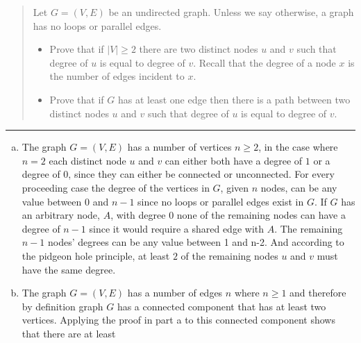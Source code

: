 \documentclass[11pt]{article}
\begin{document}


\begin{quote}
\item 
Let $G=(V,E)$ be an undirected graph. Unless we say otherwise, a graph has no loops or parallel edges.

\begin{itemize}
\item Prove that if $|V| \ge 2$ there are two distinct nodes $u$ and $v$ such that degree of $u$ is equal to degree of $v$.  Recall that the degree of a node $x$ is the number of edges incident to $x$.
\item Prove that if $G$ has at least one edge then there is a path between two distinct nodes $u$ and $v$ such that degree of $u$ is equal to degree of $v$.
\end{itemize}

\end{quote}
\hrule



\begin{solution}
\item 
\begin{enumerate}[(a)]
\item The graph $G = (V,E)$ has a number of vertices $n \ge 2$, in the case where $n=2$ each distinct node $u$ and $v$ can either both have a degree of $1$ or a degree of $0$, since they can either be connected or unconnected. For every proceeding case the degree of the vertices in $G$, given $n$ nodes, can be any value between $0$ and $n-1$ since no loops or parallel edges exist in $G$. If $G$  has an arbitrary node, $A$, with degree $0$ none of the remaining nodes can have a degree of $n-1$ since it would require a shared edge with $A$. The remaining $n-1$ nodes' degrees can  be any value between 1 and n-2. And according to the pidgeon hole principle, at least $2$ of the remaining nodes $u$ and $v$ must have the same degree.

\item The graph $G = (V,E)$ has a number of edges $n$ where $n \ge 1$ and therefore by definition graph $G$ has a connected component that has at least two vertices. Applying the proof in part a to this connected component shows that there are at least 


\end{enumerate}
\end{solution}
\end{document}
